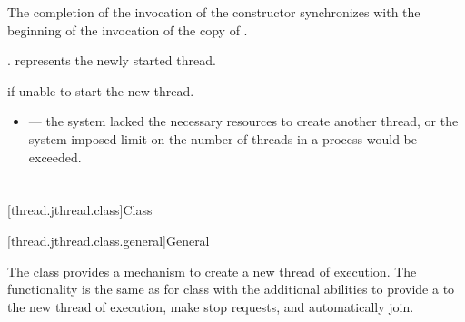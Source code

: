 \documentclass{wg21}
\begin{document}
\begin{itemdescr}
\pnum
\sync
The completion of the invocation of the constructor
synchronizes with the beginning of the invocation of the copy of .

\pnum
\ensures
{}.  represents the newly started thread.

\pnum
\throws
{} if unable to start the new thread.

\pnum
\errors
\begin{itemize}
    \item {} --- the system lacked the necessary
    resources to create another thread, or the system-imposed limit on the number of
    threads in a process would be exceeded.
\end{itemize}
\end{itemdescr}

\section{}

[thread.jthread.class]{Class }

[thread.jthread.class.general]{General}

\pnum
The class  provides a mechanism
to create a new thread of execution.
The functionality is the same as for
class 
with the additional abilities to provide
a  to the new thread of execution,
make stop requests, and automatically join.
\end{document}
